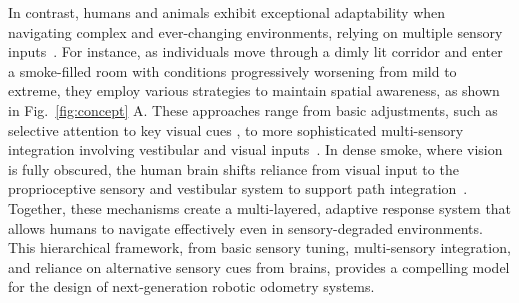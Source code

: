 In contrast, humans and animals exhibit exceptional adaptability when navigating complex and ever-changing environments, relying on multiple sensory inputs~\cite{ptito2006sensory}.
For instance, as individuals move through a dimly lit corridor and enter a smoke-filled room with conditions progressively worsening from mild to extreme, they employ various strategies to maintain spatial awareness, as shown in Fig.~\ref{fig:concept} A.
These approaches range from basic adjustments, such as selective attention to key visual cues \cite{nuthmann2020salience}, to more sophisticated multi-sensory integration involving vestibular and visual inputs~\cite{ptito2006sensory, braunstein2014depth}. In dense smoke, where vision is fully obscured, the human brain shifts reliance from visual input to the proprioceptive sensory and vestibular system to support path integration~\cite{bostelmann2020path}.
Together, these mechanisms create a multi-layered, adaptive response system that allows humans to navigate effectively even in sensory-degraded environments.
This hierarchical framework, from basic sensory tuning, multi-sensory integration, and reliance on alternative sensory cues from brains, provides a compelling model for the design of next-generation robotic odometry systems.

